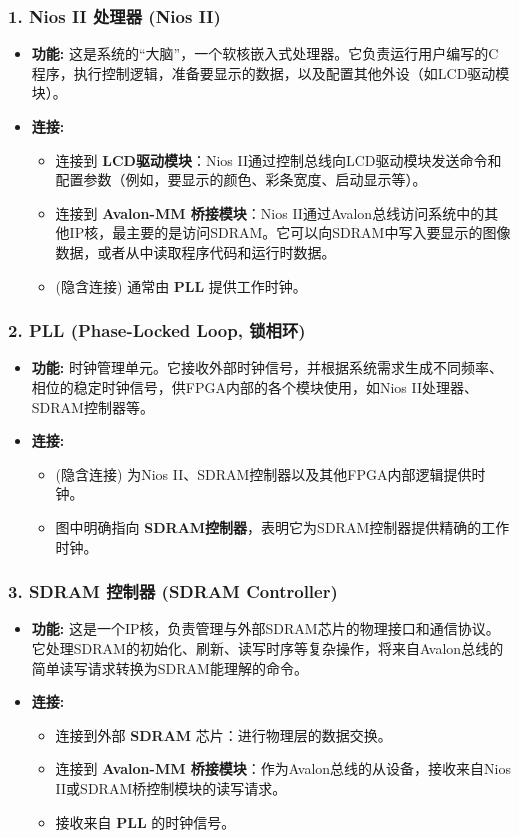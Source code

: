 \documentclass[12pt,hyperref,a4paper,UTF8]{ctexart}
\begin{document}
\subsubsection*{1. Nios II 处理器 (Nios II)}
\begin{itemize}
    \item \textbf{功能:} 这是系统的“大脑”，一个软核嵌入式处理器。它负责运行用户编写的C程序，执行控制逻辑，准备要显示的数据，以及配置其他外设（如LCD驱动模块）。
    \item \textbf{连接:}
    \begin{itemize}
        \item 连接到 \textbf{LCD驱动模块}：Nios II通过控制总线向LCD驱动模块发送命令和配置参数（例如，要显示的颜色、彩条宽度、启动显示等）。
        \item 连接到 \textbf{Avalon-MM 桥接模块}：Nios II通过Avalon总线访问系统中的其他IP核，最主要的是访问SDRAM。它可以向SDRAM中写入要显示的图像数据，或者从中读取程序代码和运行时数据。
        \item (隐含连接) 通常由 \textbf{PLL} 提供工作时钟。
    \end{itemize}
\end{itemize}

\subsubsection*{2. PLL (Phase-Locked Loop, 锁相环)}
\begin{itemize}
    \item \textbf{功能:} 时钟管理单元。它接收外部时钟信号，并根据系统需求生成不同频率、相位的稳定时钟信号，供FPGA内部的各个模块使用，如Nios II处理器、SDRAM控制器等。
    \item \textbf{连接:}
    \begin{itemize}
        \item (隐含连接) 为Nios II、SDRAM控制器以及其他FPGA内部逻辑提供时钟。
        \item 图中明确指向 \textbf{SDRAM控制器}，表明它为SDRAM控制器提供精确的工作时钟。
    \end{itemize}
\end{itemize}

\subsubsection*{3. SDRAM 控制器 (SDRAM Controller)}
\begin{itemize}
    \item \textbf{功能:} 这是一个IP核，负责管理与外部SDRAM芯片的物理接口和通信协议。它处理SDRAM的初始化、刷新、读写时序等复杂操作，将来自Avalon总线的简单读写请求转换为SDRAM能理解的命令。
    \item \textbf{连接:}
    \begin{itemize}
        \item 连接到外部 \textbf{SDRAM} 芯片：进行物理层的数据交换。
        \item 连接到 \textbf{Avalon-MM 桥接模块}：作为Avalon总线的从设备，接收来自Nios II或SDRAM桥控制模块的读写请求。
        \item 接收来自 \textbf{PLL} 的时钟信号。
    \end{itemize}
\end{itemize}
\end{document}
